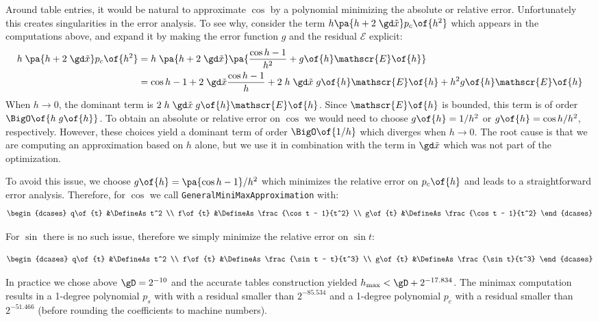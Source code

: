 \documentclass[10pt, a4paper, twoside]{basestyle}
\newcommand{\red}[1]{\tilde{#1}}
\begin{document}
Around table entries, it would be natural to approximate $\cos$ by a polynomial minimizing the absolute or relative error.  Unfortunately this creates singularities in the error analysis.  To see why, consider the term $h \pa{h + 2 \; \gd \red x} p_c\of{h^2}$ which appears in the computations above, and expand it by making the error function $g$ and the residual $\mathscr{E}$ explicit:
\begin{align*}
h \; \pa{h + 2 \; \gd \red x} p_c\of{h^2} &= h \; \pa{h + 2 \; \gd \red x} \pa{\frac{\cos h - 1}{h^2} + g\of{h} \mathscr{E}\of{h}} \\
&= \cos h - 1 + 2 \; \gd \red x \frac{\cos h - 1}{h} + 2 \; h \; \gd \red x \; g\of{h} \mathscr{E}\of{h} + h^2 g\of{h} \mathscr{E}\of{h}
\end{align*}
When $h \to 0$, the dominant term is $2 \; h \; \gd \red x \; g\of{h} \mathscr{E}\of{h}$.  Since $\mathscr{E}\of{h}$ is bounded, this term is of order $\BigO\of{h \; g\of{h}}$.  To obtain an absolute or relative error on $\cos$ we would need to choose $g\of{h} = 1/h^2$ or $g\of{h} = \cos h/h^2$, respectively.  However, these choices yield a dominant term of order $\BigO\of{1/h}$ which diverges when $h \to 0$.  The root cause is that we are computing an approximation based on $h$ alone, but we use it in combination with the term in $\gd \red x$ which was not part of the optimization.

To avoid this issue, we choose $g\of{h} = \pa{\cos h - 1}/h^2$ which minimizes the relative error on $p_c\of{h}$ and leads to a straightforward error analysis.  Therefore, for $\cos$ we call \texttt{GeneralMiniMaxApproximation} with:
\[
\begin{dcases}
q\of{t} &\DefineAs t^2 \\
f\of{t} &\DefineAs \frac{\cos t - 1}{t^2} \\
g\of{t} &\DefineAs \frac{\cos t - 1}{t^2}
\end{dcases}
\]

For $\sin$ there is no such issue, therefore we simply minimize the relative error on $\sin t$:

\[
\begin{dcases}
q\of{t} &\DefineAs t^2 \\
f\of{t} &\DefineAs \frac{\sin t - t}{t^3} \\
g\of{t} &\DefineAs \frac{\sin t}{t^3}
\end{dcases}
\]

In practice we chose above $\gD = 2^{-10}$ and the accurate tables construction yielded $h_{\text{max}} < \gD + 2^{-17.834}$.  The minimax computation results in a 1-degree polynomial $p_s$ with with a residual smaller than $2^{-85.534}$ and a 1-degree polynomial $p_c$ with a residual smaller than $2^{-51.466}$ (before rounding the coefficients to machine numbers).
\end{document}
